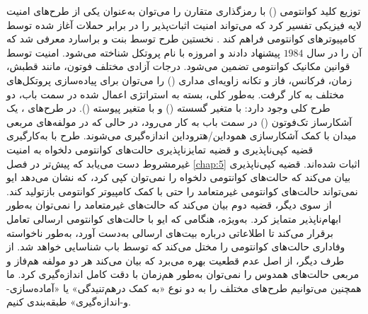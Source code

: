 توزیع کلید کوانتومی () با رمزگذاری متقارن را می‌توان به‌عنوان یکی از طرح‌های امنیت لایه فیزیکی تفسیر کرد که می‌تواند امنیت اثبات‌پذیر را در برابر حملات آغاز شده توسط کامپیوترهای کوانتومی فراهم کند \cite{7-19}. نخستین طرح  توسط بنت و براسارد معرفی شد که آن را در سال $1984$ پیشنهاد دادند \cite{7-13, 7-14} و امروزه با نام پروتکل  شناخته می‌شود. امنیت  توسط قوانین مکانیک کوانتومی تضمین می‌شود. درجات آزادی مختلف فوتون، مانند قطبش، زمان، فرکانس، فاز و تکانه زاویه‌ای مداری () را می‌توان برای پیاده‌سازی پروتکل‌های مختلف  به کار گرفت. به‌طور کلی، بسته به استراتژی اعمال شده در سمت باب، دو طرح کلی  وجود دارد:  با متغیر گسسته () و  با متغیر پیوسته (). در طرح‌های ، یک آشکارساز تک‌فوتون () در سمت باب به کار می‌رود، در حالی که در  مولفه‌های مربعی میدان با کمک آشکارسازی هموداین/هتروداین اندازه‌گیری می‌شوند. طرح  با به‌کارگیری قضیه کپی‌ناپذیری و قضیه تمایزناپذیری حالت‌های کوانتومی دلخواه به امنیت غیرمشروط دست می‌یابد که پیش‌تر در فصل \ref{chap:5} اثبات شده‌اند. قضیه کپی‌ناپذیری بیان می‌کند که حالت‌های کوانتومی دلخواه را نمی‌توان کپی کرد، که نشان می‌دهد ایو نمی‌تواند حالت‌های کوانتومی غیرمتعامد را حتی با کمک کامپیوتر کوانتومی بازتولید کند. از سوی دیگر، قضیه دوم بیان می‌کند که حالت‌های غیرمتعامد را نمی‌توان به‌طور ابهام‌ناپذیر متمایز کرد. به‌ویژه، هنگامی که ایو با حالت‌های کوانتومی ارسالی تعامل برقرار می‌کند تا اطلاعاتی درباره بیت‌های ارسالی به‌دست آورد، به‌طور ناخواسته وفاداری حالت‌های کوانتومی را مختل می‌کند که توسط باب شناسایی خواهد شد. از طرف دیگر،  از اصل عدم قطعیت بهره می‌برد که بیان می‌کند هر دو مولفه هم‌فاز و مربعی حالت‌های همدوس را نمی‌توان به‌طور هم‌زمان با دقت کامل اندازه‌گیری کرد. ما همچنین می‌توانیم طرح‌های مختلف  را به دو نوع «به کمک درهم‌تنیدگی» یا «آماده‌سازی-و-اندازه‌گیری» طبقه‌بندی کنیم.

